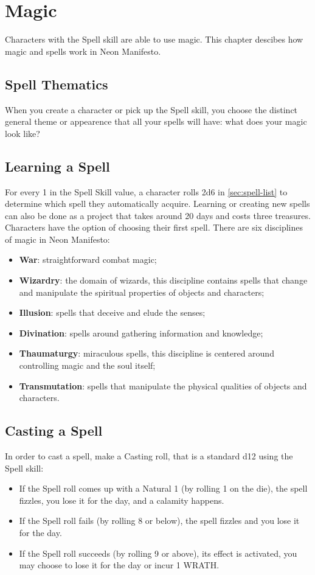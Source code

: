 \newpage
\section{Magic}
\label{sec:magic}

Characters with the Spell skill are able to use magic. This chapter descibes how magic and spells work in Neon Manifesto.

\subsection{Spell Thematics}
When you create a character or pick up the Spell skill, you choose the distinct general theme or appearence that all your spells will have: what does your magic look like?

\subsection{Learning a Spell}
For every 1 in the Spell Skill value, a character rolls 2d6 in \ref{sec:spell-list} to determine which spell they automatically acquire. Learning or creating new spells can also be done as a project that takes around 20 days and costs three treasures. Characters have the option of choosing their first spell. There are six disciplines of magic in Neon Manifesto:
\begin{itemize}
    \item {\textbf{War}: straightforward combat magic;}
    \item {\textbf{Wizardry}: the domain of wizards, this discipline contains spells that change and manipulate the spiritual properties of objects and characters;}
    \item {\textbf{Illusion}: spells that deceive and elude the senses;}
    \item {\textbf{Divination}: spells around gathering information and knowledge;}
    \item {\textbf{Thaumaturgy}: miraculous spells, this discipline is centered around controlling magic and the soul itself;}
    \item {\textbf{Transmutation}: spells that manipulate the physical qualities of objects and characters.}
\end{itemize}

\subsection{Casting a Spell}
In order to cast a spell, make a Casting roll, that is a standard d12 using the Spell skill:
\begin{itemize}
    \item If the Spell roll comes up with a Natural 1 (by rolling 1 on the die), the spell fizzles, you lose it for the day, and a calamity happens.
    \item If the Spell roll fails (by rolling 8 or below), the spell fizzles and you lose it for the day.
    \item If the Spell roll succeeds (by rolling 9 or above), its effect is activated, you may choose to lose it for the day or incur 1 WRATH.
\end{itemize}

